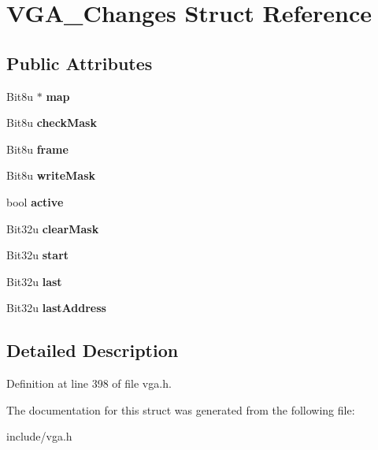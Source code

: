 \hypertarget{structVGA__Changes}{\section{V\-G\-A\-\_\-\-Changes Struct Reference}
\label{structVGA__Changes}
}
\subsection*{Public Attributes}
\begin{DoxyCompactItemize}
\item 
\hypertarget{structVGA__Changes_aae6472354347c41048cfab1219789b64}{Bit8u $\ast$ {\bfseries map}}\label{structVGA__Changes_aae6472354347c41048cfab1219789b64}

\item 
\hypertarget{structVGA__Changes_a6ae67831c523b25bdc21fa4db83afe43}{Bit8u {\bfseries check\-Mask}}\label{structVGA__Changes_a6ae67831c523b25bdc21fa4db83afe43}

\item 
\hypertarget{structVGA__Changes_ac26763f63772c078c7743773f53cde98}{Bit8u {\bfseries frame}}\label{structVGA__Changes_ac26763f63772c078c7743773f53cde98}

\item 
\hypertarget{structVGA__Changes_ad700dfb8efd57be98a89c9204d4af2f7}{Bit8u {\bfseries write\-Mask}}\label{structVGA__Changes_ad700dfb8efd57be98a89c9204d4af2f7}

\item 
\hypertarget{structVGA__Changes_a5e1eb3db4e0041fcaa05d426cf0bcf7b}{bool {\bfseries active}}\label{structVGA__Changes_a5e1eb3db4e0041fcaa05d426cf0bcf7b}

\item 
\hypertarget{structVGA__Changes_a64765a10e9ca419e7fe12ad0cd73f297}{Bit32u {\bfseries clear\-Mask}}\label{structVGA__Changes_a64765a10e9ca419e7fe12ad0cd73f297}

\item 
\hypertarget{structVGA__Changes_adcb1b4110d1643ca21b047ff682124b5}{Bit32u {\bfseries start}}\label{structVGA__Changes_adcb1b4110d1643ca21b047ff682124b5}

\item 
\hypertarget{structVGA__Changes_af476a9d8e176d26e02c9297300ed8baf}{Bit32u {\bfseries last}}\label{structVGA__Changes_af476a9d8e176d26e02c9297300ed8baf}

\item 
\hypertarget{structVGA__Changes_a65c792a3ddf72b6a016b3b221857f3b7}{Bit32u {\bfseries last\-Address}}\label{structVGA__Changes_a65c792a3ddf72b6a016b3b221857f3b7}

\end{DoxyCompactItemize}


\subsection{Detailed Description}


Definition at line 398 of file vga.\-h.



The documentation for this struct was generated from the following file\-:\begin{DoxyCompactItemize}
\item 
include/vga.\-h\end{DoxyCompactItemize}

